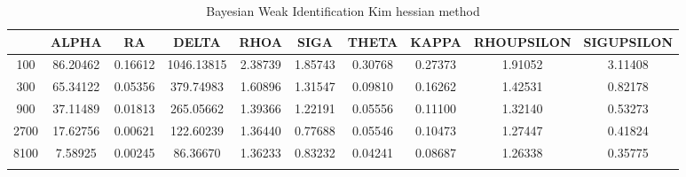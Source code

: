 \documentclass[a4paper,10pt]{article}
\begin{document}
\centering
\begin{longtable}{cccccccccc}
\toprule
 & ALPHA & RA & DELTA & RHOA & SIGA & THETA & KAPPA & RHOUPSILON & SIGUPSILON \\
\midrule
100 & 86.20462 & 0.16612 & 1046.13815 & 2.38739 & 1.85743 & 0.30768 & 0.27373 & 1.91052 & 3.11408 \\
300 & 65.34122 & 0.05356 & 379.74983 & 1.60896 & 1.31547 & 0.09810 & 0.16262 & 1.42531 & 0.82178 \\
900 & 37.11489 & 0.01813 & 265.05662 & 1.39366 & 1.22191 & 0.05556 & 0.11100 & 1.32140 & 0.53273 \\
2700 & 17.62756 & 0.00621 & 122.60239 & 1.36440 & 0.77688 & 0.05546 & 0.10473 & 1.27447 & 0.41824 \\
8100 & 7.58925 & 0.00245 & 86.36670 & 1.36233 & 0.83232 & 0.04241 & 0.08687 & 1.26338 & 0.35775 \\
\bottomrule
\caption{Bayesian Weak Identification Kim hessian method}
\label{table:tbl:WeakKim_hessian}
\end{longtable}
\end{document}
